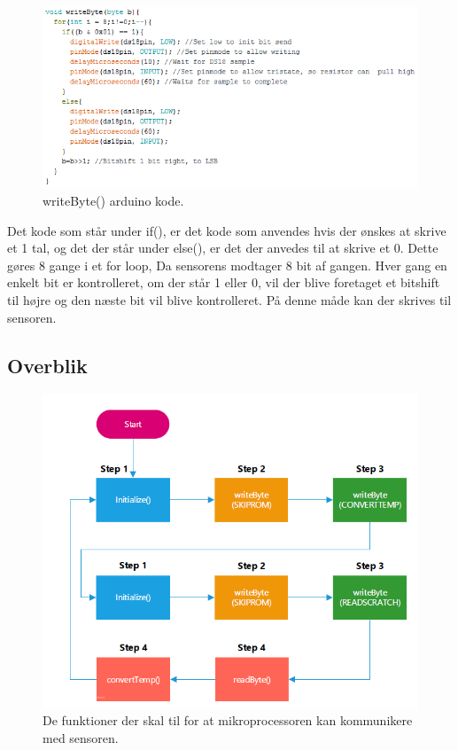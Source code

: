 \begin{figure}[h!]
  \centering
  \includegraphics[width=1\textwidth]{figures/write_byte.png}
  \caption{writeByte() arduino kode.}
  \label{write_byte}
\end{figure}
Det kode som står under if(), er det kode som anvendes hvis der ønskes at skrive et 1 tal, og det der står under else(), er det der anvedes til at skrive et 0. Dette gøres 8 gange i et for loop, Da sensorens modtager 8 bit af gangen. Hver gang en enkelt bit er kontrolleret, om der står 1 eller 0, vil der blive foretaget et bitshift til højre og den næste bit vil blive kontrolleret. På denne måde kan der skrives til sensoren.


\subsection{Overblik}

\begin{figure}[h!]
  \centering
  \includegraphics[width=1\textwidth]{figures/sensor_communication.png}
  \caption{De funktioner der skal til for at mikroprocessoren kan kommunikere med sensoren.}
  \label{sensor_total}
\end{figure}